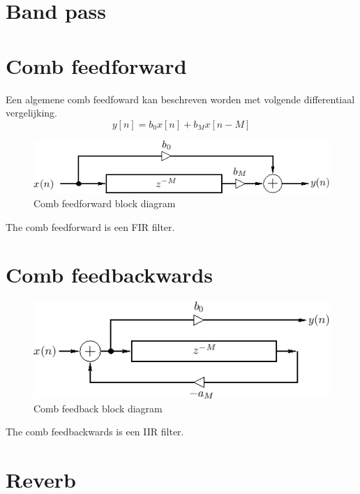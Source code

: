 \documentclass[11pt]{article} %
\begin{document}
\section{Band pass}

\section{Comb feedforward}
Een algemene comb feedfoward kan beschreven worden met volgende differentiaal vergelijking. 
\begin{equation}
y[n] = b_0x[n]+b_Mx[n-M]
\end{equation}
\begin{figure}
	\centering
	\includegraphics[scale=0.5]{CombFeedfowardBlockDiagram.png}
	\caption{Comb feedforward block diagram}
	\label{Fig:CombFeedforwardBlockDiagram}
\end{figure}

The comb feedforward is een FIR filter.

\section{Comb feedbackwards}
\begin{figure}
	\centering
	\includegraphics[scale=0.5]{CombFeedbackBlockDiagram.png}
	\caption{Comb feedback block diagram}
	\label{Fig:CombFeedbackBlockDiagram}
\end{figure}

The comb feedbackwards is een IIR filter.

\section{Reverb}
\end{document}
